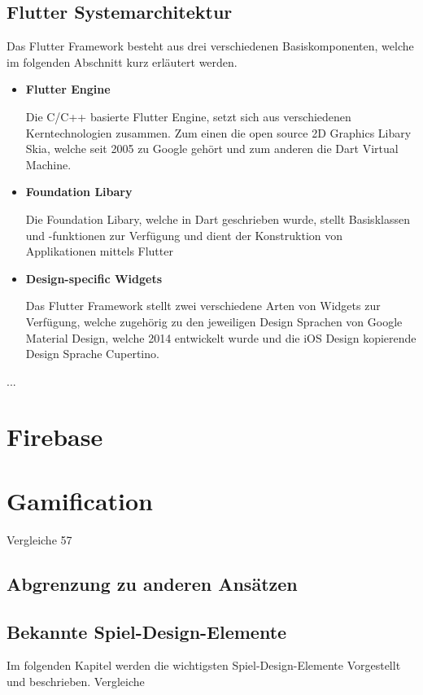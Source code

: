 \documentclass{scrreprt}
\begin{document}
\subsection{Flutter Systemarchitektur} 
Das Flutter Framework besteht aus drei verschiedenen Basiskomponenten, welche im folgenden Abschnitt kurz erläutert werden.
\begin{itemize}
\item{\textbf{Flutter Engine}}

Die C/C++ basierte Flutter Engine, setzt sich aus verschiedenen Kerntechnologien zusammen. Zum einen die open source 2D Graphics Libary Skia\citep{Skia1}, welche seit 2005 zu Google gehört und zum anderen die Dart Virtual Machine.
\item{\textbf{Foundation Libary}}

Die Foundation Libary, welche in Dart geschrieben wurde, stellt Basisklassen und -funktionen zur Verfügung und dient der Konstruktion von Applikationen mittels Flutter
\item{\textbf{Design-specific Widgets}}

Das Flutter Framework stellt zwei verschiedene Arten von Widgets zur Verfügung, welche zugehörig zu den jeweiligen Design Sprachen von Google Material Design\citep{Mat1}, welche 2014 entwickelt wurde und die iOS Design kopierende Design Sprache Cupertino\citep{Cup1}.
\end{itemize}

		...

\section{Firebase}

\section{Gamification} \label{sec:grundlagenkapitelGamification}
Vergleiche \citep{Strahringer2017}57

\subsection{Abgrenzung zu anderen Ansätzen}

\subsection{Bekannte Spiel-Design-Elemente}
Im folgenden Kapitel werden die wichtigsten Spiel-Design-Elemente \citep[vgl.]{blohm2013gamification} Vorgestellt und beschrieben. 
Vergleiche \citep[Kapitel 2.2.2 Analyse einzelner Spiel-Design-Elemente]{Sailer2016}\\
\end{document}
